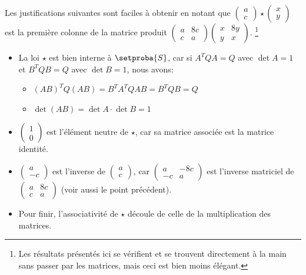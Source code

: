 \medskip

Les justifications suivantes sont faciles à obtenir en notant que
$\begin{pmatrix}
  a \\
  c
\end{pmatrix}
\star
\begin{pmatrix}
  x \\
  y
\end{pmatrix}$
est la première colonne de la matrice produit
$\begin{pmatrix}
  a & 8c \\
  c & a
\end{pmatrix}
\begin{pmatrix}
  x & 8y \\
  y & x
\end{pmatrix}$.%
\footnote{
	Les résultats présentés ici se vérifient et se trouvent directement à la main sans passer par les matrices, mais ceci est bien moins élégant.
}


\begin{itemize}
	\item La loi $\star$ est bien interne à $\setproba{S}$, car si $A^T Q A = Q$ avec $\det A = 1$ et $B^T Q B = Q$ avec $\det B = 1$, nous avons:

	\begin{itemize}
		\item $(AB)^T Q (AB) = B^T A^T Q A B = B^T Q B = Q$

		\medskip
		\item $\det(AB) = \det A \cdot \det B = 1$
	\end{itemize}


	\medskip
	\item
	$\begin{pmatrix}
	  1 \\
	  0
	\end{pmatrix}$
	est l'élément neutre de $\star$, car sa matrice associée est la matrice identité.


	\medskip
	\item
	$\begin{pmatrix}
	  a  \\
	  -c
	\end{pmatrix}$
	est l'inverse de
	$\begin{pmatrix}
	  a \\
	  c
	\end{pmatrix}$,
	car
	$\begin{pmatrix}
	  a  & -8c \\
	  -c & a
	\end{pmatrix}$
	est l'inverse matriciel de
	$\begin{pmatrix}
	  a & 8c \\
	  c & a
	\end{pmatrix}$
    (voir aussi le point précédent).


	\medskip
	\item Pour finir, l'associativité de $\star$ découle de celle de la multiplication des matrices.
\end{itemize}
